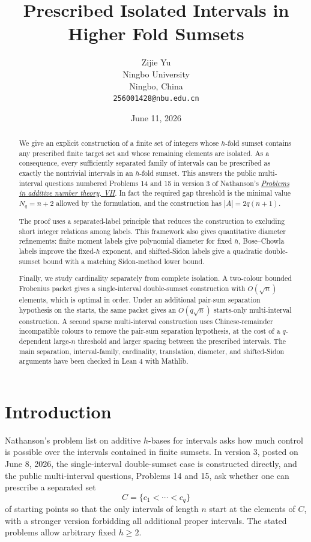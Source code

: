 \documentclass[11pt]{article}
\title{Prescribed Isolated Intervals in Higher Fold Sumsets}
\author{Zijie Yu\\
Ningbo University\\
Ningbo, China\\
\texttt{256001428@nbu.edu.cn}}
\date{June 11, 2026}
\begin{document}
\maketitle

\begin{abstract}
We give an explicit construction of a finite set of integers whose $h$-fold
sumset contains any prescribed finite target set and whose remaining elements
are isolated. As a consequence, every sufficiently separated family of
intervals can be prescribed as exactly the nontrivial intervals in an
$h$-fold sumset. This answers the public multi-interval questions numbered
Problems 14 and 15 in version 3 of Nathanson's
\href{https://arxiv.org/abs/2605.26425}{\emph{Problems in additive number
theory, VII}}. In fact the required gap threshold is the minimal value
$N_q=n+2$ allowed by the formulation, and the construction has
$|A|=2q(n+1)$.

The proof uses a separated-label principle that reduces the construction to
excluding short integer relations among labels. This framework also gives
quantitative diameter refinements: finite moment labels give polynomial
diameter for fixed $h$, Bose--Chowla labels improve the fixed-$h$ exponent,
and shifted-Sidon labels give a quadratic double-sumset bound with a matching
Sidon-method lower bound.

Finally, we study cardinality separately from complete isolation. A two-colour
bounded Frobenius packet gives a single-interval double-sumset construction
with $O(\sqrt n)$ elements, which is optimal in order. Under an additional
pair-sum separation hypothesis on the starts, the same packet gives an
$O(q\sqrt n)$ starts-only multi-interval construction. A second sparse
multi-interval construction uses Chinese-remainder incompatible colours to
remove the pair-sum separation hypothesis, at the cost of a $q$-dependent
large-$n$ threshold and larger spacing between the prescribed intervals. The
main separation, interval-family, cardinality, translation, diameter, and
shifted-Sidon arguments have been checked in Lean 4 with Mathlib.
\end{abstract}

\section{Introduction}

Nathanson's problem list on additive $h$-bases for intervals asks how much
control is possible over the intervals contained in finite sumsets. In
version 3, posted on June 8, 2026, the single-interval double-sumset case is
constructed directly, and the public multi-interval questions, Problems 14
and 15, ask whether one can
prescribe a separated set
\[
 C=\{c_1<\cdots<c_q\}
\]
of starting points so that the only intervals of length $n$ start at the
elements of $C$, with a stronger version forbidding all additional proper
intervals. The stated problems allow arbitrary fixed $h\geq 2$.
\end{document}
